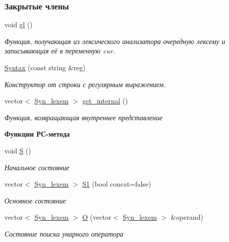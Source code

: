 \subsubsection*{Закрытые члены}
\begin{DoxyCompactItemize}
\item 
\hypertarget{class_syntax_a5139d8fddfa05e199bf12b8ef7bd3620}{}void \hyperlink{class_syntax_a5139d8fddfa05e199bf12b8ef7bd3620}{gl} ()\label{class_syntax_a5139d8fddfa05e199bf12b8ef7bd3620}

\begin{DoxyCompactList}\small\item\em Функция, получающая из лексического анализатора очередную лексему и записывающая её в переменную cur. \end{DoxyCompactList}\item 
\hyperlink{class_syntax_a52bc44b52e3dceea48a1e71f65d5e3cf}{Syntax} (const string \&reg)
\begin{DoxyCompactList}\small\item\em Конструктор от строки с регулярным выражением. \end{DoxyCompactList}\item 
vector$<$ \hyperlink{class_syn__lexem}{Syn\+\_\+lexem} $>$ \hyperlink{class_syntax_a61442ccace7e6d58205cc2988bd5391b}{get\+\_\+internal} ()
\begin{DoxyCompactList}\small\item\em Функция, возвращающая внутреннее представление \end{DoxyCompactList}\end{DoxyCompactItemize}
\begin{Indent}{\bf Функции РС-\/метода}\par
\begin{DoxyCompactItemize}
\item 
void \hyperlink{class_syntax_af5d09263aadaa0b9a264ebf436beb9e8}{S} ()
\begin{DoxyCompactList}\small\item\em Начальное состояние \end{DoxyCompactList}\item 
vector$<$ \hyperlink{class_syn__lexem}{Syn\+\_\+lexem} $>$ \hyperlink{class_syntax_ad3bf45fadc4d20146f0a6c85d970d714}{S1} (bool concat=false)
\begin{DoxyCompactList}\small\item\em Основное состояние \end{DoxyCompactList}\item 
vector$<$ \hyperlink{class_syn__lexem}{Syn\+\_\+lexem} $>$ \hyperlink{class_syntax_a4ed2d9c690da119299e6e74fc9332f16}{O} (vector$<$ \hyperlink{class_syn__lexem}{Syn\+\_\+lexem} $>$ \&operand)
\begin{DoxyCompactList}\small\item\em Состояние поиска унарного оператора \end{DoxyCompactList}\end{DoxyCompactItemize}
\end{Indent}
